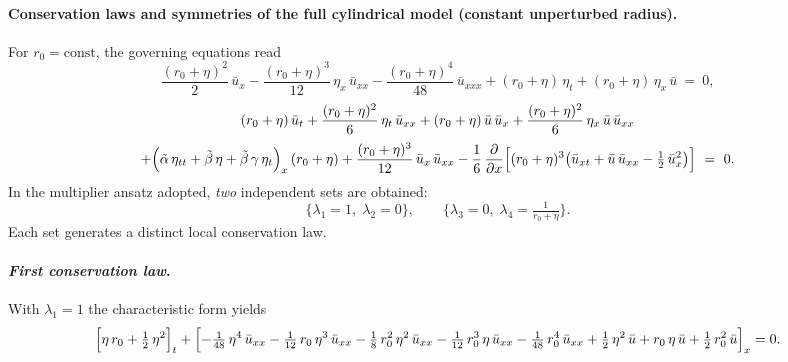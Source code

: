 \documentclass[alpha-refs, 12pt]{wiley-article}
\newcommand{\pd}[2]{\frac{\partial #1}{\partial #2}}
\begin{document}
\paragraph{Conservation laws and symmetries of the full cylindrical model (constant unperturbed radius).} For $r_{0}=\mathrm{const}$, the governing equations read
\begin{equation}\label{eq:d1}
  \frac{(r_{0}+\eta)^{2}}{2}\,\bar{u}_{x}
  -\frac{(r_{0}+\eta)^{3}}{12}\,\eta_{x}\,\bar{u}_{xx}
  -\frac{(r_{0}+\eta)^{4}}{48}\,\bar{u}_{xxx}
  +(r_{0}+\eta)\,\eta_{t}
  +(r_{0}+\eta)\,\eta_{x}\,\bar{u}\ =\ 0,
\end{equation}
\begin{multline}\label{eq:d2}
  (r_{0}+\eta)\,\bar{u}_{t}
  +\frac{(r_{0}+\eta)^{2}}{6}\,\eta_{t}\,\bar{u}_{xx}
  +(r_{0}+\eta)\,\bar{u}\,\bar{u}_{x}
  +\frac{(r_{0}+\eta)^{2}}{6}\,\eta_{x}\,\bar{u}\,\bar{u}_{xx}
  \\[2pt]
  +\Bigl(\tilde{\alpha}\,\eta_{tt}
        +\tilde{\beta}\,\eta
        +\tilde{\beta}\,\gamma\,\eta_{t}\Bigr)_{x}\,(r_{0}+\eta)
  +\frac{(r_{0}+\eta)^{3}}{12}\,\bar{u}_{x}\,\bar{u}_{xx}
  -\frac{1}{6}\,\pd{}{x}
        \Bigl[(r_{0}+\eta)^{3}
              \bigl(\bar{u}_{xt}
                    +\bar{u}\,\bar{u}_{xx}
                    -\tfrac{1}{2}\,\bar{u}_{x}^{2}\bigr)\Bigr]\ =\ 0.
\end{multline}
In the multiplier ansatz adopted, \emph{two} independent sets are obtained:
\[
  \bigl\{\lambda_{1}=1,\;\lambda_{2}=0\bigr\},
  \qquad
  \bigl\{\lambda_{3}=0,\;
         \lambda_{4}=\tfrac{1}{r_{0}+\eta}\bigr\}.
\]
Each set generates a distinct local conservation law.

\paragraph{\textit{First conservation law}.} With $\lambda_{1}=1$ the characteristic form yields
\begin{equation}\label{eq:a}
  \Bigl[\eta\,r_{0}+\tfrac12\,\eta^{2}\Bigr]_{t}
  +\Bigl[
        -\tfrac1{48}\,\eta^{4}\,\bar{u}_{xx}
        -\tfrac1{12}\,r_{0}\,\eta^{3}\,\bar{u}_{xx}
        -\tfrac18\,r_{0}^{2}\,\eta^{2}\,\bar{u}_{xx}
        -\tfrac1{12}\,r_{0}^{3}\,\eta\,\bar{u}_{xx}
        -\tfrac1{48}\,r_{0}^{4}\,\bar{u}_{xx}
        +\tfrac12\,\eta^{2}\,\bar{u}
        +r_{0}\,\eta\,\bar{u}
        +\tfrac12\,r_{0}^{2}\,\bar{u}
  \Bigr]_{x}=0.
\end{equation}
\end{document}
